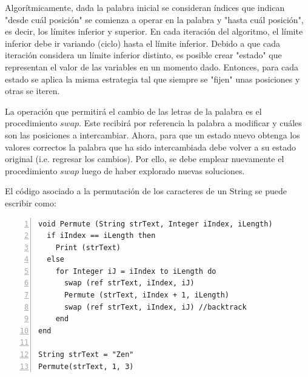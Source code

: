 Algorítmicamente, dada la palabra inicial se consideran índices que indican "desde cuál posición" se comienza a operar en la palabra y "hasta cuál posición", es decir, los límites inferior y superior. En cada iteración del algoritmo, el límite inferior debe ir variando (ciclo) hasta el límite inferior. Debido a que cada iteración considera un límite inferior distinto, es posible crear "estado" que representan el valor de las variables en un momento dado. Entonces, para cada estado se aplica la misma estrategia tal que siempre se "fijen" unas posiciones y otras se iteren.

La operación que permitirá el cambio de las letras de la palabra es el procedimiento $swap$. Este recibirá por referencia la palabra a modificar y cuáles son las posiciones a intercambiar. Ahora, para que un estado nuevo obtenga los valores correctos la palabra que ha sido intercambiada debe volver a su estado original (i.e. regresar los cambios). Por ello, se debe emplear nuevamente el procedimiento $swap$ luego de haber explorado nuevas soluciones.

El código asociado a la permutación de los caracteres de un String se puede escribir como:

\begin{lstlisting}[upquote=true, language=pseudo, numbers=left]
void Permute (String strText, Integer iIndex, iLength)
  if iIndex == iLength then
    Print (strText)
  else
    for Integer iJ = iIndex to iLength do
      swap (ref strText, iIndex, iJ)
      Permute (strText, iIndex + 1, iLength)
      swap (ref strText, iIndex, iJ) //backtrack
    end
end

String strText = "Zen"
Permute(strText, 1, 3)
\end{lstlisting}

